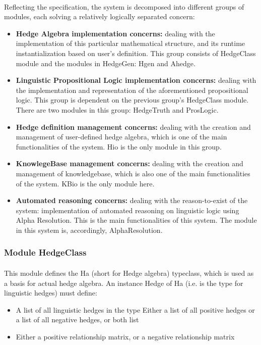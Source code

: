 \documentclass[../gr-final.tex]{subfiles}
\begin{document}
\paragraph{} Reflecting the specification, the system is decomposed
into different groups of modules, each solving a relatively logically separated
concern:
\begin{itemize}
\item {\bfseries Hedge Algebra implementation concerns:} dealing with
  the implementation of this particular mathematical structure, and
  its runtime instantialization based on user's definition. This
  group consists of HedgeClass module and the modules in HedgeGen:
  Hgen and Ahedge.
\item {\bfseries Linguistic Propositional Logic implementation concerns:} dealing
  with the implementation and representation of the aforementioned
  propositional logic. This group is dependent on the previous group's
  HedgeClass module. There are two modules in this group: HedgeTruth
  and ProsLogic.
\item {\bfseries Hedge definition management concerns:} dealing with the creation
  and management of user-defined hedge algebra, which is one of the
  main functionalities of the system. Hio is the only module in this
  group. 
\item {\bfseries KnowlegeBase management concerns:} dealing with the
  creation and management of knowledgebase, which is also one of the
  main functionalities of the system. KBio is the only module here.
\item {\bfseries Automated reasoning concerns:} dealing with the
  reason-to-exist of the system: implementation of automated reasoning
  on linguistic logic using Alpha Resolution. This is the main
  functionalities of this system. The module in this system is,
  accordingly, AlphaResolution.
\end{itemize}
\subsubsection{Module HedgeClass}

\paragraph{}This module defines the Ha (short for Hedge algebra) typeclass, which is used as a basis for  actual hedge algebra. An instance Hedge of Ha (i.e. is the type for linguistic hedges) must define:

\begin{itemize}
\item A list of all linguistic hedges in the type Either a list of all
  positive hedges or a list of all negative hedges, or both list
\item  Either a positive relationship matrix, or a negative relationship
  matrix
\end{itemize}
\end{document}

